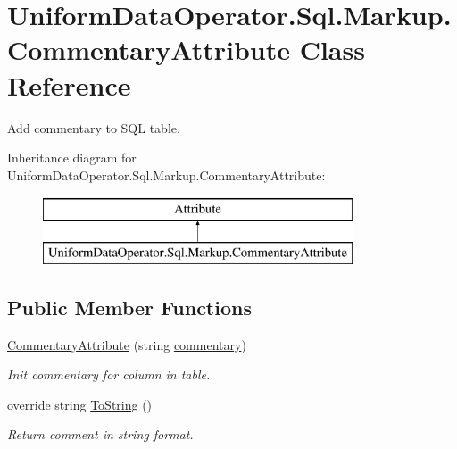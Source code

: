 \hypertarget{class_uniform_data_operator_1_1_sql_1_1_markup_1_1_commentary_attribute}{}\section{Uniform\+Data\+Operator.\+Sql.\+Markup.\+Commentary\+Attribute Class Reference}
\label{class_uniform_data_operator_1_1_sql_1_1_markup_1_1_commentary_attribute}


Add commentary to S\+QL table.  


Inheritance diagram for Uniform\+Data\+Operator.\+Sql.\+Markup.\+Commentary\+Attribute\+:\begin{figure}[H]
\begin{center}
\leavevmode
\includegraphics[height=2.000000cm]{d0/d7f/class_uniform_data_operator_1_1_sql_1_1_markup_1_1_commentary_attribute}
\end{center}
\end{figure}
\subsection*{Public Member Functions}
\begin{DoxyCompactItemize}
\item 
\mbox{\hyperlink{class_uniform_data_operator_1_1_sql_1_1_markup_1_1_commentary_attribute_a89e4ce7ba19efd0b533ef9a5d013658d}{Commentary\+Attribute}} (string \mbox{\hyperlink{class_uniform_data_operator_1_1_sql_1_1_markup_1_1_commentary_attribute_a729a7d6773b3df9dd31090b1cf8e35b1}{commentary}})
\begin{DoxyCompactList}\small\item\em Init commentary for column in table. \end{DoxyCompactList}\item 
override string \mbox{\hyperlink{class_uniform_data_operator_1_1_sql_1_1_markup_1_1_commentary_attribute_a90440c0a6947fd524fef872cdb7c7683}{To\+String}} ()
\begin{DoxyCompactList}\small\item\em Return comment in string format. \end{DoxyCompactList}\end{DoxyCompactItemize}
